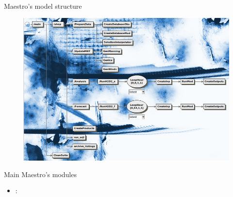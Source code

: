 \documentclass{beamer}
\begin{document}
\begin{frame}{Maestro's model structure}


\begin{figure}
\includegraphics[scale=0.5]{800px-Flow.png}
\end{figure}

\framebreak

Main Maestro's modules
\begin{itemize}
\item :
\end{itemize}
\end{frame}
\end{document}
